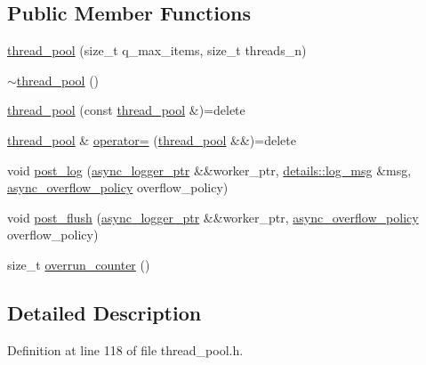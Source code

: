 \subsection*{Public Member Functions}
\begin{DoxyCompactItemize}
\item 
\hyperlink{classspdlog_1_1details_1_1thread__pool_a2ac821eb936f7373cc51949fb05e841c}{thread\+\_\+pool} (size\+\_\+t q\+\_\+max\+\_\+items, size\+\_\+t threads\+\_\+n)
\item 
\hyperlink{classspdlog_1_1details_1_1thread__pool_a27e41d821a8aa8137bc0e64df031ccd4}{$\sim$thread\+\_\+pool} ()
\item 
\hyperlink{classspdlog_1_1details_1_1thread__pool_a5e8f86d40f81af1d22a21ee0368287b2}{thread\+\_\+pool} (const \hyperlink{classspdlog_1_1details_1_1thread__pool}{thread\+\_\+pool} \&)=delete
\item 
\hyperlink{classspdlog_1_1details_1_1thread__pool}{thread\+\_\+pool} \& \hyperlink{classspdlog_1_1details_1_1thread__pool_a1a62f3ab1474d69cd1e25143664e856d}{operator=} (\hyperlink{classspdlog_1_1details_1_1thread__pool}{thread\+\_\+pool} \&\&)=delete
\item 
void \hyperlink{classspdlog_1_1details_1_1thread__pool_a70cc09729d82174d84640eaface150e0}{post\+\_\+log} (\hyperlink{namespacespdlog_1_1details_a9b6989c16b6150f7e4658ea2aee01bc2}{async\+\_\+logger\+\_\+ptr} \&\&worker\+\_\+ptr, \hyperlink{structspdlog_1_1details_1_1log__msg}{details\+::log\+\_\+msg} \&msg, \hyperlink{namespacespdlog_a42e109759a11c9514d3f6313a7709852}{async\+\_\+overflow\+\_\+policy} overflow\+\_\+policy)
\item 
void \hyperlink{classspdlog_1_1details_1_1thread__pool_aa851092603e816f78dd81bb980232048}{post\+\_\+flush} (\hyperlink{namespacespdlog_1_1details_a9b6989c16b6150f7e4658ea2aee01bc2}{async\+\_\+logger\+\_\+ptr} \&\&worker\+\_\+ptr, \hyperlink{namespacespdlog_a42e109759a11c9514d3f6313a7709852}{async\+\_\+overflow\+\_\+policy} overflow\+\_\+policy)
\item 
size\+\_\+t \hyperlink{classspdlog_1_1details_1_1thread__pool_adc34920f65797d8f54986dc1894a8804}{overrun\+\_\+counter} ()
\end{DoxyCompactItemize}


\subsection{Detailed Description}


Definition at line 118 of file thread\+\_\+pool.\+h.



